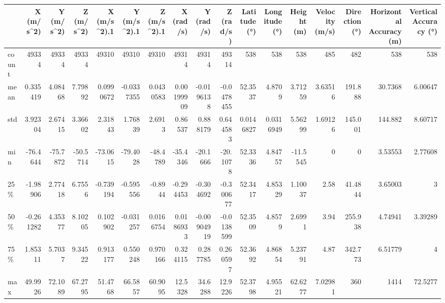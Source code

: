 \begin{tabular}{lrrrrrrrrrrrrrrrr}
\hline
       &    X (m/s\^{}2) &   Y (m/s\^{}2) &   Z (m/s\^{}2) &   X (m/s\^{}2).1 &   Y (m/s\^{}2).1 &   Z (m/s\^{}2).1 &      X (rad/s) &      Y (rad/s) &     Z (rad/s) &   Latitude (°) &   Longitude (°) &   Height (m) &   Velocity (m/s) &   Direction (°) &   Horizontal Accuracy (m) &   Vertical Accuracy (°) \\
\hline
 count & 49334        & 49334       & 49334       & 49310         & 49310         & 49310         & 49314          & 49314          & 49314         &    538         &     538         &    538       &        485       &        482      &                 538       &               538       \\
 mean  &     0.335419 &     4.08468 &     7.79892 &     0.0990672 &    -0.0337355 &     0.0430583 &     0.00199909 &    -0.0196138  &    -0.0478455 &     52.3537    &       4.8709    &      3.71259 &          3.63516 &        191.888  &                  30.7368  &                 6.00647 \\
 std   &     3.92304  &     2.67415 &     3.36602 &     2.31843   &     1.76839   &     2.6913    &     0.86537    &     0.888179   &     0.644583  &      0.0146827 &       0.0316949 &      5.56299 &          1.69126 &        145.001  &                 144.882   &                 8.60717 \\
 min   &   -76.4644   &   -75.7872  &   -50.5714  &   -73.0615    &   -79.4028    &   -48.4789    &   -35.4346     &   -20.1666     &   -20.1078    &     52.3336    &       4.84757   &    -11.5545  &          0       &          0      &                   3.53553 &                 2.77608 \\
 25\%   &    -1.98906  &     2.77418 &     6.7556  &    -0.739194  &    -0.595556  &    -0.8944    &    -0.294453   &    -0.304692   &    -0.300677  &     52.3417    &       4.85329   &      1.10037 &          2.58    &         41.4844 &                   3.65003 &                 3       \\
 50\%   &    -0.261282 &     4.35377 &     8.10205 &     0.102902  &    -0.031257  &     0.0166754 &     0.0186933  &    -0.00904919 &    -0.0138599 &     52.3509    &       4.8579    &      2.6991  &          3.94    &        255.938  &                   4.74941 &                 3.39289 \\
 75\%   &     1.85311  &     5.7037  &     9.34522 &     0.913177  &     0.550248  &     0.970166  &     0.324115   &     0.287785   &     0.260597  &     52.3692    &       4.86854   &      5.23791 &          4.87    &        342.773  &                   6.51779 &                 4       \\
 max   &    49.9926   &    72.1089  &    67.2795  &    51.4768    &    66.5857    &    60.9095    &    12.5328     &    34.6288     &    12.9226    &     52.3798    &       4.95521   &     62.6277  &          7.02981 &        360      &                1414       &                72.5277  \\
\hline
\end{tabular}